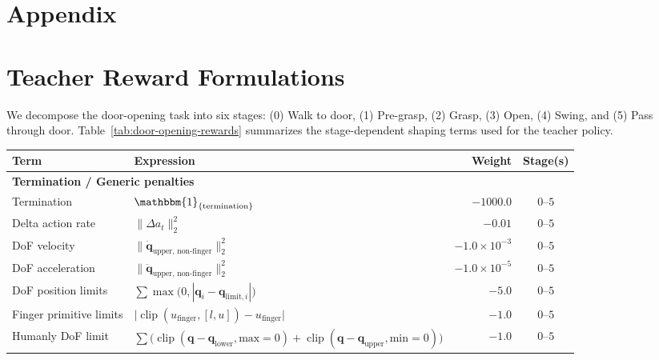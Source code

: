 \section*{Appendix}

\section{Teacher Reward Formulations}
\label{app:teacher-reward}

We decompose the door-opening task into six stages: (0) Walk to door, (1) Pre-grasp, (2) Grasp, (3) Open, (4) Swing, and (5) Pass through door. Table~\ref{tab:door-opening-rewards} summarizes the stage-dependent shaping terms used for the teacher policy.

\begin{table}[t]
\centering
\footnotesize
\setlength{\tabcolsep}{3pt}
\renewcommand{\arraystretch}{1.1}
\begin{tabular}{l l r c}
\toprule
\textbf{Term} & \textbf{Expression} & \textbf{Weight} & \textbf{Stage(s)} \\
\midrule
\multicolumn{4}{l}{\textbf{Termination / Generic penalties}} \\
Termination
  & $\mathbbm{1}_{\{\text{termination}\}}$
  & $-1000.0$ & $0$--$5$ \\

Delta action rate
  & $\|\Delta a_t\|_2^{2}$
  & $-0.01$ & $0$--$5$ \\

DoF velocity
  & $\|\dot{\mathbf{q}}_{\text{upper, non-finger}}\|_2^{2}$
  & $-1.0\times 10^{-3}$ & $0$--$5$ \\

DoF acceleration
  & $\|\ddot{\mathbf{q}}_{\text{upper, non-finger}}\|_2^{2}$
  & $-1.0\times 10^{-5}$ & $0$--$5$ \\

DoF position limits
  & $\sum\max\bigl(0, |\mathbf{q}_i - \mathbf{q}_{\text{limit},i}|\bigr)$
  & $-5.0$ & $0$--$5$ \\

Finger primitive limits
  & $\bigl|\operatorname{clip}(u_{\text{finger}},[l,u]) - u_{\text{finger}}\bigr|$
  & $-1.0$ & $0$--$5$ \\

Humanly DoF limit
  & $\sum\bigl(\operatorname{clip}(\mathbf{q}-\mathbf{q}_{\text{lower}},\text{max}=0) + \operatorname{clip}(\mathbf{q}-\mathbf{q}_{\text{upper}},\text{min}=0)\bigr)$
  & $-1.0$ & $0$--$5$ \\


\end{tabular}
\end{table}
